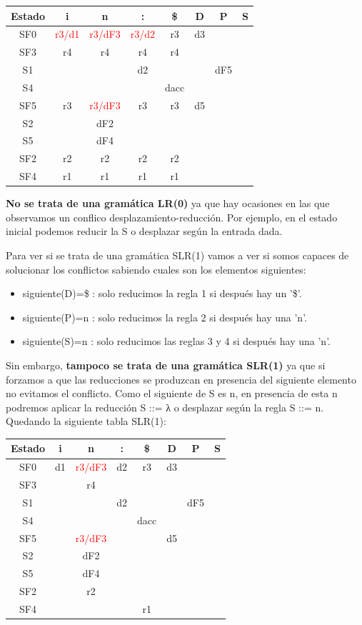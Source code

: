 \documentclass[nochap]{apuntes}
\begin{document}
\begin{problem}
\ppart
\begin{tabular}{| c | c | c | c | c | c | c | c | }
\hline
Estado & i & n & : & \$ & D & P & S\\
\hline
SF0 & \textcolor{red}{r3/d1} & \textcolor{red}{r3/dF3} & \textcolor{red}{r3/d2} & r3 & d3 &  & \\
\hline
SF3 & r4 & r4 & r4 & r4 &  &   & \\
\hline
S1 &  &  & d2 &  &  & dF5 &\\
\hline
S4 &  &  &  & dacc &  &  & \\
\hline
SF5 & r3 &  \textcolor{red}{r3/dF3} & r3 & r3 & d5 &  & \\
\hline
S2 &  & dF2 &  &  &  &  &\\
\hline
S5 &  & dF4  &  &  & &  &\\
\hline
SF2 & r2 & r2 & r2 & r2 &  &  & \\
\hline
SF4 & r1 & r1 & r1 & r1 &  &  & \\
\hline
\end{tabular}
\ppart \textbf{No se trata de una gramática LR(0)} ya que hay ocasiones en las que observamos un conflico desplazamiento-reducción. Por ejemplo, en el estado inicial podemos reducir la S o desplazar según la entrada dada.

Para ver si se trata de una gramática SLR(1) vamos a ver si somos capaces de solucionar los conflictos sabiendo cuales son los elementos siguientes:
\begin{itemize}
\item siguiente(D)={\$} : solo reducimos la regla 1 si después hay un '\$'.
\item siguiente(P)={n} : solo reducimos la regla 2 si después hay una 'n'.
\item siguiente(S)={n} : solo reducimos las reglas 3 y 4 si después hay una 'n'.
\end{itemize}

Sin embargo, \textbf{tampoco se trata de una gramática SLR(1)} ya que si forzamos a que las reducciones se produzcan en presencia del siguiente elemento no evitamos el conflicto. Como el siguiente de S es n, en presencia de esta n podremos aplicar la reducción S ::= λ o desplazar según la regla S ::= n. Quedando la siguiente tabla SLR(1):

\begin{tabular}{| c | c | c | c | c | c | c | c | }
\hline
Estado & i & n & : & \$ & D & P & S\\
\hline
SF0 & d1 & \textcolor{red}{r3/dF3} & d2 & r3 & d3 &  & \\
\hline
SF3 &  & r4 &  &  &  &   & \\
\hline
S1 &  &  & d2 &  &  & dF5 &\\
\hline
S4 &  &  &  & dacc &  &  & \\
\hline
SF5 &  &  \textcolor{red}{r3/dF3} &  &  & d5 &  & \\
\hline
S2 &  & dF2 &  &  &  &  &\\
\hline
S5 &  & dF4  &  &  & &  &\\
\hline
SF2 &  & r2 &  &  &  &  & \\
\hline
SF4 &  &  &  & r1 &  &  & \\
\hline
\end{tabular}


\end{problem}
\end{document}
